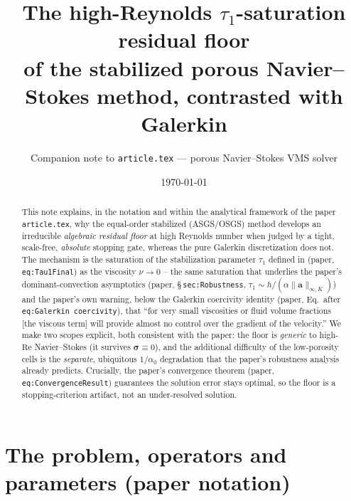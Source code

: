 \documentclass[11pt]{article}
\title{\bf The high-Reynolds $\tau_1$-saturation residual floor\\
of the stabilized porous Navier--Stokes method, contrasted with Galerkin}
\author{Companion note to \texttt{article.tex} --- porous Navier--Stokes VMS solver}
\date{\today}
\newcommand{\ba}{\boldsymbol{a}}
\newcommand{\bsig}{\boldsymbol{\sigma}}
\newcommand{\Reyn}{\mathrm{Re}}
\begin{document}
\maketitle

\begin{abstract}
This note explains, in the notation and within the analytical framework of the
paper \texttt{article.tex}, why the equal-order stabilized (ASGS/OSGS) method
develops an irreducible \emph{algebraic residual floor} at high Reynolds number
when judged by a tight, scale-free, \emph{absolute} stopping gate, whereas the
pure Galerkin discretization does not. The mechanism is the saturation of the
stabilization parameter $\tau_1$ defined in (paper, \texttt{eq:Tau1Final}) as the
viscosity $\nu\to0$ -- the same saturation that underlies the paper's
dominant-convection asymptotics (paper, \S\,\texttt{sec:Robustness},
$\tau_1\sim h/(\alpha\lVert\ba\rVert_{\infty,K})$) and the paper's own warning,
below the Galerkin coercivity identity (paper, Eq.~after \texttt{eq:Galerkin
coercivity}), that ``for very small viscosities or fluid volume fractions [the
viscous term] will provide almost no control over the gradient of the velocity.''
We make two scopes explicit, both consistent with the paper: the floor is
\emph{generic} to high-$\Reyn$ Navier--Stokes (it survives $\bsig\equiv0$), and
the additional difficulty of the low-porosity cells is the \emph{separate},
ubiquitous $1/\alpha_0$ degradation that the paper's robustness analysis already
predicts. Crucially, the paper's convergence theorem (paper,
\texttt{eq:ConvergenceResult}) guarantees the solution error stays optimal, so
the floor is a stopping-criterion artifact, not an under-resolved solution.
\end{abstract}

\section{The problem, operators and parameters (paper notation)}\label{sec:setup}
\end{document}
